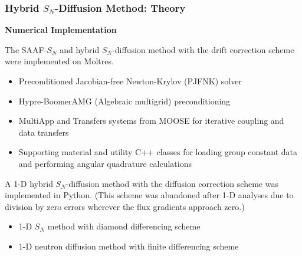 \begin{frame}
  \frametitle{Hybrid $S_N$-Diffusion Method: Theory}
  \textbf{Numerical Implementation}
  \vspace{.2cm}

  The SAAF-$S_N$ and hybrid $S_N$-diffusion method with the drift correction scheme were
  implemented on Moltres.
  \begin{itemize}
    \item Preconditioned Jacobian-free Newton-Krylov (PJFNK) solver \cite{knoll_jacobian-free_2004}
    \item Hypre-BoomerAMG (Algebraic multigrid) preconditioning \cite{hypre_hypre_2022}
    \item MultiApp and Transfers systems from MOOSE for iterative coupling and data transfers
    \item Supporting material and utility C++ classes for loading group constant data and performing
      angular quadrature calculations
  \end{itemize}
  \vspace{.2cm}

  A 1-D hybrid $S_N$-diffusion method with the diffusion correction
  scheme was implemented in Python. (This scheme was abandoned after 1-D analyses due to division by
  zero errors wherever the flux gradients approach zero.)
  \begin{itemize}
    \item 1-D $S_N$ method with diamond differencing scheme
    \item 1-D neutron diffusion method with finite differencing scheme
  \end{itemize}
\end{frame}
